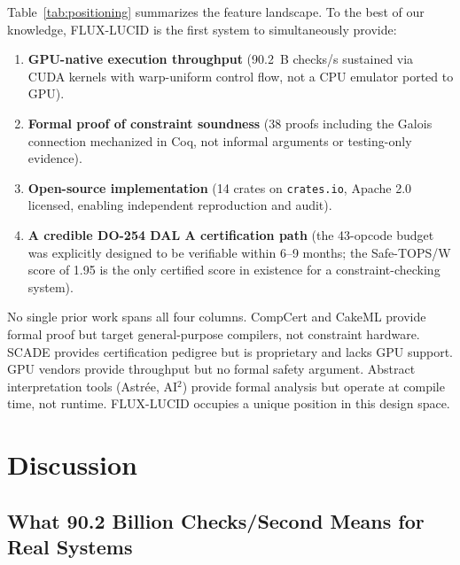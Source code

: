 \documentclass[sigplan,review,anonymous]{acmart}
\begin{document}
{Table~\ref{tab:positioning} summarizes the feature landscape. To the best
of our knowledge, FLUX-LUCID is the first system to simultaneously provide:
\begin{enumerate}
  \item \textbf{GPU-native execution throughput} (90.2~B checks/s sustained
        via CUDA kernels with warp-uniform control flow, not a CPU emulator
        ported to GPU).
  \item \textbf{Formal proof of constraint soundness} (38 proofs including
        the Galois connection mechanized in Coq, not informal arguments or
        testing-only evidence).
  \item \textbf{Open-source implementation} (14 crates on \texttt{crates.io},
        Apache 2.0 licensed, enabling independent reproduction and audit).
  \item \textbf{A credible DO-254 DAL A certification path} (the 43-opcode
        budget was explicitly designed to be verifiable within 6--9 months;
        the Safe-TOPS/W score of 1.95 is the only certified score in
        existence for a constraint-checking system).
\end{enumerate}

No single prior work spans all four columns. CompCert and CakeML provide
formal proof but target general-purpose compilers, not constraint hardware.
SCADE provides certification pedigree but is proprietary and lacks GPU
support. GPU vendors provide throughput but no formal safety argument.
Abstract interpretation tools (Astr\'{e}e, AI$^2$) provide formal analysis
but operate at compile time, not runtime. FLUX-LUCID occupies a unique
position in this design space.


\section{Discussion}
\label{sec:discussion}

\subsection{What 90.2 Billion Checks/Second Means for Real Systems}
\label{sec:discuss-throughput}

}
\end{document}
